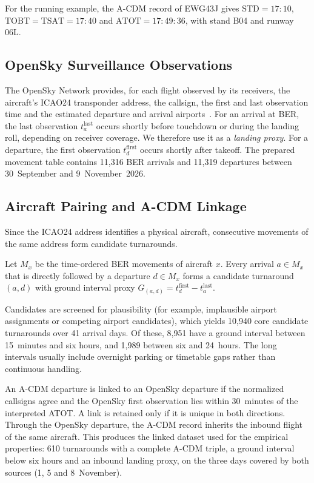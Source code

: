 For the running example, the A-CDM record of EWG43J gives $\mathrm{STD}=17{:}10$, $\mathrm{TOBT}=\mathrm{TSAT}=17{:}40$ and $\mathrm{ATOT}=17{:}49{:}36$, with stand B04 and runway 06L.

\subsection{OpenSky Surveillance Observations}
The OpenSky Network provides, for each flight observed by its receivers, the aircraft's ICAO24 transponder address, the callsign, the first and last observation time and the estimated departure and arrival airports~\cite{opensky_rest}. For an arrival at BER, the last observation $t^{\mathrm{last}}_a$ occurs shortly before touchdown or during the landing roll, depending on receiver coverage. We therefore use it as a \emph{landing proxy}. For a departure, the first observation $t^{\mathrm{first}}_d$ occurs shortly after takeoff. The prepared movement table contains 11,316 BER arrivals and 11,319 departures between 30~September and 9~November~2026.

\subsection{Aircraft Pairing and A-CDM Linkage}
Since the ICAO24 address identifies a physical aircraft, consecutive movements of the same address form candidate turnarounds.

\begin{definition}
Let $M_x$ be the time-ordered BER movements of aircraft $x$. Every arrival $a\in M_x$ that is directly followed by a departure $d\in M_x$ forms a candidate turnaround $(a,d)$ with ground interval proxy $G_{(a,d)}=t^{\mathrm{first}}_d-t^{\mathrm{last}}_a$.
\end{definition}

Candidates are screened for plausibility (for example, implausible airport assignments or competing airport candidates), which yields 10,940 core candidate turnarounds over 41 arrival days. Of these, 8,951 have a ground interval between 15~minutes and six hours, and 1,989 between six and 24~hours. The long intervals usually include overnight parking or timetable gaps rather than continuous handling.

An A-CDM departure is linked to an OpenSky departure if the normalized callsigns agree and the OpenSky first observation lies within 30~minutes of the interpreted ATOT. A link is retained only if it is unique in both directions. Through the OpenSky departure, the A-CDM record inherits the inbound flight of the same aircraft. This produces the linked dataset used for the empirical properties: 610 turnarounds with a complete A-CDM triple, a ground interval below six hours and an inbound landing proxy, on the three days covered by both sources (1, 5 and 8~November).

